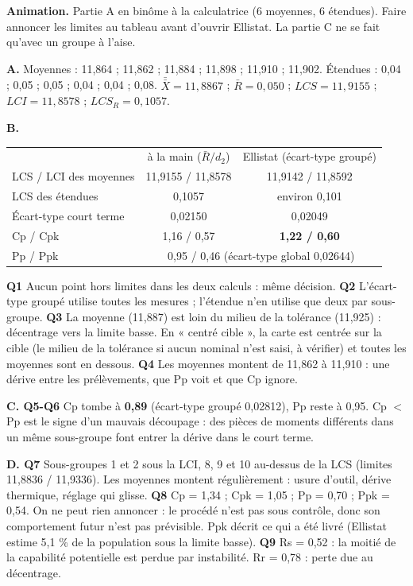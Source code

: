 \documentclass[10pt,a4paper]{article}
\begin{document}
\textbf{Animation.} Partie A en binôme à la calculatrice (6 moyennes, 6 étendues). Faire annoncer les limites au tableau avant d'ouvrir Ellistat. La partie C ne se fait qu'avec un groupe à l'aise.
\begin{tcolorbox}[corr]
\textbf{A.} Moyennes : 11,864 ; 11,862 ; 11,884 ; 11,898 ; 11,910 ; 11,902. Étendues : 0,04 ; 0,05 ; 0,05 ; 0,04 ; 0,04 ; 0,08.
$\bar{\bar X} = 11{,}8867$ ; $\bar R = 0{,}050$ ; $LCS = 11{,}9155$ ; $LCI = 11{,}8578$ ; $LCS_R = 0{,}1057$.

\textbf{B.}\par\renewcommand{\arraystretch}{1.1}
\begin{tabular}{@{}lcc@{}}
 & à la main ($\bar R/d_2$) & Ellistat (écart-type groupé)\\
LCS / LCI des moyennes & 11,9155 / 11,8578 & 11,9142 / 11,8592\\
LCS des étendues & 0,1057 & environ 0,101\\
Écart-type court terme & 0,02150 & 0,02049\\
Cp / Cpk & 1,16 / 0,57 & \textbf{1,22 / 0,60}\\
Pp / Ppk & \multicolumn{2}{c}{0,95 / 0,46 (écart-type global 0,02644)}\\
\end{tabular}

\textbf{Q1} Aucun point hors limites dans les deux calculs : même décision. \textbf{Q2} L'écart-type groupé utilise toutes les mesures ; l'étendue n'en utilise que deux par sous-groupe. \textbf{Q3} La moyenne (11,887) est loin du milieu de la tolérance (11,925) : décentrage vers la limite basse. En « centré cible », la carte est centrée sur la cible (le milieu de la tolérance si aucun nominal n'est saisi, à vérifier) et toutes les moyennes sont en dessous. \textbf{Q4} Les moyennes montent de 11,862 à 11,910 : une dérive entre les prélèvements, que Pp voit et que Cp ignore.

\textbf{C. Q5-Q6} Cp tombe à \textbf{0,89} (écart-type groupé 0,02812), Pp reste à 0,95. Cp $<$ Pp est le signe d'un mauvais découpage : des pièces de moments différents dans un même sous-groupe font entrer la dérive dans le court terme.

\textbf{D. Q7} Sous-groupes 1 et 2 sous la LCI, 8, 9 et 10 au-dessus de la LCS (limites 11,8836 / 11,9336). Les moyennes montent régulièrement : usure d'outil, dérive thermique, réglage qui glisse. \textbf{Q8} Cp = 1,34 ; Cpk = 1,05 ; Pp = 0,70 ; Ppk = 0,54. On ne peut rien annoncer : le procédé n'est pas sous contrôle, donc son comportement futur n'est pas prévisible. Ppk décrit ce qui a été livré (Ellistat estime 5,1 \% de la population sous la limite basse). \textbf{Q9} Rs = 0,52 : la moitié de la capabilité potentielle est perdue par instabilité. Rr = 0,78 : perte due au décentrage.
\end{tcolorbox}
\end{document}
